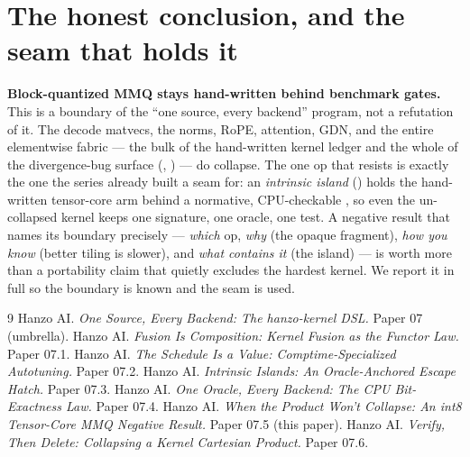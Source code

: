 \documentclass[11pt]{article}
\begin{document}
\section{The honest conclusion, and the seam that holds it}
\label{sec:conclusion}

\textbf{Block-quantized MMQ stays hand-written behind benchmark gates.} This is a boundary of the
``one source, every backend'' program, not a refutation of it. The decode matvecs, the norms, RoPE,
attention, GDN, and the entire elementwise fabric --- the bulk of the hand-written kernel ledger and the
whole of the divergence-bug surface (\cite{method}, \cite{oracle}) --- do collapse. The one op that
resists is exactly the one the series already built a seam for: an \emph{intrinsic island} (\cite{island})
holds the hand-written tensor-core arm behind a normative, CPU-checkable , so even the
un-collapsed kernel keeps one signature, one oracle, one test. A negative result that names its boundary
precisely --- \emph{which} op, \emph{why} (the opaque fragment), \emph{how you know} (better tiling is
slower), and \emph{what contains it} (the island) --- is worth more than a portability claim that quietly
excludes the hardest kernel. We report it in full so the boundary is known and the seam is used.

\begin{thebibliography}{9}
\small
{} Hanzo AI. \emph{One Source, Every Backend: The hanzo-kernel DSL.} Paper 07 (umbrella).
 Hanzo AI. \emph{Fusion Is Composition: Kernel Fusion as the Functor Law.} Paper 07.1.
 Hanzo AI. \emph{The Schedule Is a Value: Comptime-Specialized Autotuning.} Paper 07.2.
 Hanzo AI. \emph{Intrinsic Islands: An Oracle-Anchored Escape Hatch.} Paper 07.3.
 Hanzo AI. \emph{One Oracle, Every Backend: The CPU Bit-Exactness Law.} Paper 07.4.
 Hanzo AI. \emph{When the Product Won't Collapse: An int8 Tensor-Core MMQ Negative Result.} Paper 07.5 (this paper).
 Hanzo AI. \emph{Verify, Then Delete: Collapsing a Kernel Cartesian Product.} Paper 07.6.
\end{thebibliography}
\end{document}
